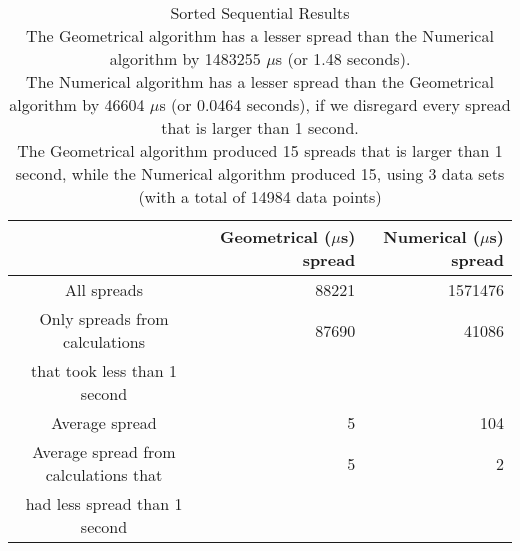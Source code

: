 \begin{table}[bth!]\footnotesize
 \begin{tabular}[3]{c|r|r}
 & Geometrical ($\mu$s) spread & Numerical ($\mu$s) spread\\
\hline
All spreads & 88221 & 1571476 \\ 
\hline 
Only spreads from calculations & 87690 & 41086 \\ 
that took less than 1 second & & \\ 
\hline
Average spread & 5 & 104 \\
\hline
Average spread from calculations that & 5 & 2 \\ 
had less spread than 1 second & & \\ 
\end{tabular}\\ \\
\caption{Sorted Sequential Results\\
The Geometrical algorithm has a lesser spread than the Numerical algorithm by 1483255 $\mu$s (or 1.48 seconds).\\
The Numerical algorithm has a lesser spread than the Geometrical algorithm by 46604 $\mu$s (or 0.0464 seconds), if we disregard every spread that is larger than 1 second.\\
The Geometrical algorithm produced 15 spreads that is larger than 1 second, while the Numerical algorithm produced 15, using 3 data sets (with a total of 14984 data points)\\
}\label{sequential-normal_spreadtable}\end{table}